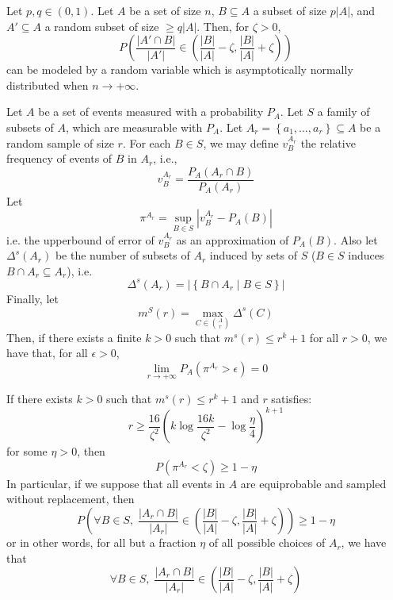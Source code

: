    \lemma[Fact 5.9]\label{fact_5.9}
        Let $p,q \in \left( 0,1 \right)$.
        Let $A$ be a set of size $n$, $B \subseteq A$ a subset of size $p|A|$, and $A' \subseteq A$ a random subset
        of size $\geq q|A|$. %
        Then, for $\zeta > 0$,
        $$
            P\left( \frac{\left| A' \cap B \right|}{\left| A' \right|} \in
                 \left( \frac{\left| B \right|}{\left| A \right|} -
                 \zeta, \frac{\left| B \right|}{\left| A \right|} + \zeta \right) \right)
        $$
        can be modeled by a random variable which is asymptotically normally distributed when $n \to +\infty$.

    \lemma[Fact 5.10]\label{fact_5.10}
        Let $A$ be a set of events measured with a probability $P_A$.
        Let $S$ a family of subsets of $A$, which are measurable with $P_A$.
        Let $A_r = \left\{ a_1, \dots, a_r \right\} \subseteq A$ be a random sample of size $r$.
        For each $B \in S$, we may define $v_B^{A_r}$ the relative frequency of events of $B$ in $A_r$, i.e.,
        $$
            v_B^{A_r} = \frac{P_A(A_r \cap B)}{P_A(A_r)}
        $$
        Let
        $$
            \pi ^{A_r} = \sup_{B \in S} \left| v_B^{A_r} - P_A(B) \right|
        $$
        i.e. the upperbound of error of $v_B^{A_r}$ as an approximation of $P_A(B)$.
        Also let $\Delta^s(A_r)$ be the number of subsets of $A_r$ induced by sets of $S$ ($B\in S$ induces
        $B \cap A_r \subseteq A_r$), i.e.
        $$
            \Delta^s(A_r) = \left| \left\{ B \cap A_r \mid B \in S \right\} \right|
        $$
        Finally, let
        $$
            m^S(r) = \max_{C \in {A \choose r}} \Delta^s(C)
        $$
        Then, if there exists a finite $k > 0$ such that $m^s(r) \leq r^k +1$ for all $r > 0$, we have that,
        for all $\epsilon > 0$,
        $$
            \lim_{r \to +\infty} P_A\left( \pi^{A_r} > \epsilon \right) = 0
        $$

    \begin{remark}[Fact 5.12]\label{fact_5.12}
        If there exists $k > 0$ such that $m^s(r) \leq r^k + 1$ and $r$ satisfies:
        $$
            r \geq \frac{16}{\zeta^2} \left( k \log \frac{16 k}{\zeta^2} - \log \frac{\eta}{4} \right)^{k+1}
        $$
        for some $\eta > 0$, then
        $$
            P\left( \pi^{A_r} < \zeta \right) \geq 1 - \eta
        $$
        In particular, if we suppose that all events in $A$ are equiprobable and sampled without replacement, then
        $$
            P\left( \forall B \in S, \; \frac{\left| A_r \cap B \right|}{\left| A_r \right|} \in
                 \left( \frac{\left| B \right|}{\left| A \right|} -
                 \zeta, \frac{\left| B \right|}{\left| A \right|} + \zeta \right) \right) \geq 1 - \eta
        $$
        or in other words, for all but a fraction $\eta$ of all possible choices of $A_r$, we have that
        $$
            \forall B \in S, \; \frac{\left| A_r \cap B \right|}{\left| A_r \right|} \in
                 \left( \frac{\left| B \right|}{\left| A \right|} -
                 \zeta, \frac{\left| B \right|}{\left| A \right|} + \zeta \right)
        $$
    \end{remark}

